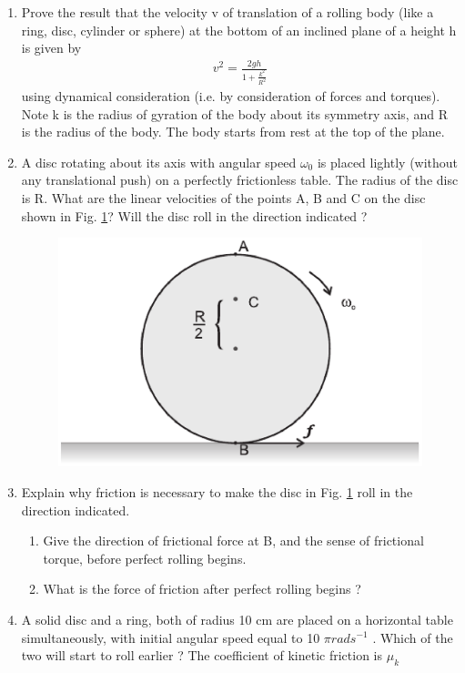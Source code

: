 \begin{enumerate}[label=\arabic*.,ref=\thesubsection.\theenumi]
\item Prove the result that the velocity v of translation of a rolling body (like a ring, disc, cylinder or sphere) at the bottom of an inclined plane of a height h is given by
\begin{align}
v^2 = \frac{2gh}{1+\frac{k^2}{R^2}}
\end{align}
using dynamical consideration (i.e. by consideration of forces and torques). Note k is the radius of gyration of the body about its symmetry axis, and R is the radius of the body. The body starts from rest at the top of the plane.
\item A disc rotating about its axis with angular speed $\omega_0$ is placed lightly (without any translational push) on a perfectly frictionless table. The radius of the disc is R. What are the linear velocities of the points A, B and C on the disc shown in Fig. \ref{fig:7.41}? Will the disc roll in the direction indicated ?
\begin{figure}[!ht]
\includegraphics[width=\columnwidth]{./figs/11-1/7/7.41.eps}
\caption{}
\label{fig:7.41}
\end{figure}
\item Explain why friction is necessary to make the disc in Fig. \ref{fig:7.41} roll in the direction indicated. 
\begin{enumerate}[label=(\alph*)]
\item  Give the direction of frictional force at B, and the sense of frictional torque, before perfect rolling begins.
\item  What is the force of friction after perfect rolling begins ?
\end{enumerate}
\item  A solid disc and a ring, both of radius 10 cm are placed on a horizontal table simultaneously, with initial angular speed equal to 10 $\pi rad s^{-1}$ . Which of the two will start to roll earlier ? The coefficient of kinetic friction is $\mu_k$

\end{enumerate}
